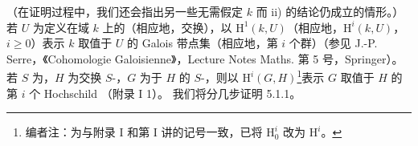 （在证明过程中，我们还会指出另一些无需假定 $k$ 而 ii) 的结论仍成立的情形。）
若 $U$ 为定义在域 $k$ 上的（相应地，交换），以 $\mathrm H^1(k,U)$（相应地，$\mathrm H^i(k,U)$，$i\geq0$）表示 $k$ 取值于 $U$ 的 Galois 带点集（相应地，第 $i$ 个群）（参见 J.-P. Serre，《Cohomologie Galoisienne》，Lecture Notes Maths. 第 5 号，Springer）。
若 $S$ 为，$H$ 为交换 $S$-，$G$ 为于 $H$ 的 $S$-，则以 $\mathrm H^i(G,H)$\footnote{编者注：为与附录 I 和第 I 讲的记号一致，已将 $\mathrm H^i_0$ 改为 $\mathrm H^i$。}表示 $G$ 取值于 $H$ 的第 $i$ 个 Hochschild （附录 I 1）。
我们将分几步证明 5.1.1。

